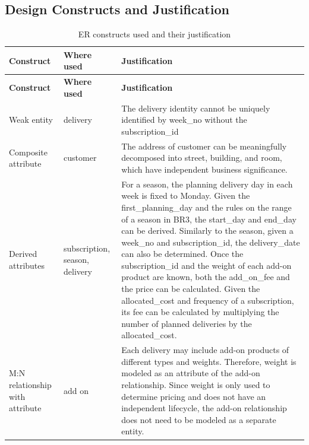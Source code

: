 \subsection{Design Constructs and Justification}
\label{sec:constructs}
\begin{xltabular}{\linewidth}{@{}L{3.5cm}L{3.4cm}Y@{}}
\caption{ER constructs used and their justification}\label{tab:constructs}\\
\toprule
{}
\textbf{Construct} & \textbf{Where used} & \textbf{Justification} \\
\midrule
\endfirsthead
{}
\toprule
{}
\textbf{Construct} & \textbf{Where used} & \textbf{Justification} \\
\midrule
\endhead
\bottomrule
\endlastfoot
Weak entity                    & delivery & The delivery identity cannot be uniquely identified by week\_no without the subscription\_id  \\
Composite attribute            & customer & The address of customer can be meaningfully decomposed into street, building, and room, which have independent business significance.  \\
Derived attributes             & subscription, season, delivery & For a season, the planning delivery day in each week is fixed to Monday. Given the first\_planning\_day and the rules on the range of a season in BR3, the start\_day and end\_day can be derived. Similarly to the season, given a week\_no and subscription\_id, the delivery\_date can also be determined. Once the subscription\_id and the weight of each add-on product are known, both the add\_on\_fee and the price can be calculated. Given the allocated\_cost and frequency of a subscription, its fee can be calculated by multiplying the number of planned deliveries by the allocated\_cost. \\
M:N relationship with attribute & add on & Each delivery may include add-on products of different types and weights. Therefore, weight is modeled as an attribute of the add-on relationship. Since weight is only used to determine pricing and does not have an independent lifecycle, the add-on relationship does not need to be modeled as a separate entity. \\
\end{xltabular}

